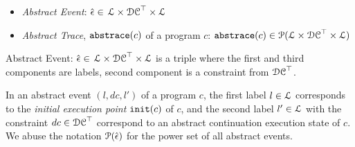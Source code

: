  \begin{itemize}
  \item \emph{Abstract Event}: 
  $\hat{\mathtt{\epsilon}{}} \in $
  $\mathcal{L} \times \mathcal{DC}^{\top} \times \mathcal{L}$
  \item \emph{Abstract Trace}, $\mathtt{abs}{\mathtt{trace}}(c)$ of a program $c$: $\mathtt{abs}{\mathtt{trace}}(c) \in \mathcal{P}( \mathcal{L} \times \mathcal{DC}^{\top} \times \mathcal{L} )$
 \end{itemize}
 \begin{defn}
   \label{def:abs_event}
   Abstract Event: 
   $\hat{\mathtt{\epsilon}{}} \in $
   $\mathcal{L} \times \mathcal{DC}^{\top} \times \mathcal{L}$
   is a 
   triple where the first and third components are labels,
   second component is a constraint from $\mathcal{DC}^{\top}$.
   \end{defn}
   In an abstract event $(l, dc, l')$ of a program $c$, 
   the first label $l \in \mathcal{L}$ corresponds to the \emph{initial execution point} $\mathtt{init}(c)$ of $c$, and 
   the second label $l' \in \mathcal{L}$ with the constraint $dc \in \mathcal{DC}^{\top}$ correspond to an abstract continuation execution state of $c$.
We abuse the notation $\mathcal{P}(\hat{\mathtt{\epsilon}{}})$ for the power set of all abstract events.


